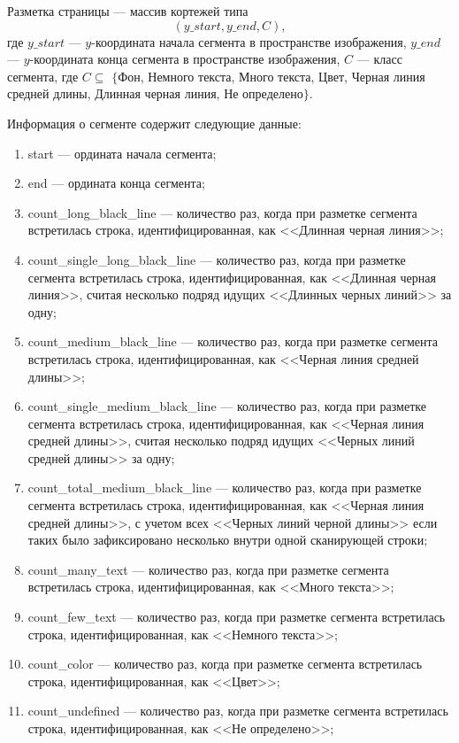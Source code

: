 Разметка страницы --- массив кортежей типа
$$
(y\_start, y\_end, C),
$$
где $y\_start$ --- $y$-координата начала сегмента в пространстве изображения, $y\_end$ --- $y$-координата конца сегмента в пространстве изображения, $C$ --- класс сегмента, где $C \subseteq$ $\{$Фон, Немного текста, Много текста, Цвет, Черная линия средней длины, Длинная черная линия, Не определено$\}$.

Информация о сегменте содержит следующие данные:
\begin{enumerate}
    \item start --- ордината начала сегмента;
    \item end --- ордината конца сегмента;
    \item count\_long\_black\_line --- количество раз, когда при разметке сегмента встретилась строка, идентифицированная, как <<Длинная черная линия>>;
    \item count\_single\_long\_black\_line --- количество раз, когда при разметке сегмента встретилась строка, идентифицированная, как <<Длинная черная линия>>, считая несколько подряд идущих <<Длинных черных линий>> за одну;
    \item count\_medium\_black\_line --- количество раз, когда при разметке сегмента встретилась строка, идентифицированная, как <<Черная линия средней длины>>;
    \item count\_single\_medium\_black\_line --- количество раз, когда при разметке сегмента встретилась строка, идентифицированная, как <<Черная линия средней длины>>, считая несколько подряд идущих <<Черных линий средней длины>> за одну;
    \item count\_total\_medium\_black\_line --- количество раз, когда при разметке сегмента встретилась строка, идентифицированная, как <<Черная линия средней длины>>, с учетом всех <<Черных линий черной длины>> если таких было зафиксировано несколько внутри одной сканирующей строки;
    \item count\_many\_text --- количество раз, когда при разметке сегмента встретилась строка, идентифицированная, как <<Много текста>>;
    \item count\_few\_text --- количество раз, когда при разметке сегмента встретилась строка, идентифицированная, как <<Немного текста>>;
    \item count\_color --- количество раз, когда при разметке сегмента встретилась строка, идентифицированная, как <<Цвет>>;
    \item count\_undefined --- количество раз, когда при разметке сегмента встретилась строка, идентифицированная, как <<Не определено>>;

\end{enumerate}
